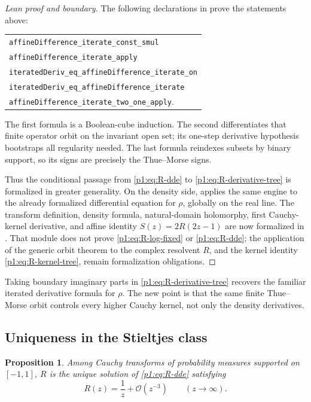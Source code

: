 \documentclass[11pt]{article}
\newtheorem{proposition}[theorem]{Proposition}
\theoremstyle{definition}
\theoremstyle{remark}
\newcommand{\bigO}{\mathcal O}
\begin{document}
\begin{proof}[Lean proof and boundary]
The following declarations in  prove the statements above:
\begin{center}
\small
\begin{tabular}{l}
\texttt{affineDifference\_iterate\_const\_smul}\\
\texttt{affineDifference\_iterate\_apply}\\
\texttt{iteratedDeriv\_eq\_affineDifference\_iterate\_on}\\
\texttt{iteratedDeriv\_eq\_affineDifference\_iterate}\\
\texttt{affineDifference\_iterate\_two\_one\_apply}.
\end{tabular}
\end{center}
The first formula is a
Boolean-cube induction.  The second differentiates that finite operator orbit on the
invariant open set; its one-step derivative hypothesis bootstraps all regularity needed.
The last formula reindexes subsets by binary support, so its signs are precisely the
Thue--Morse signs.

Thus the conditional passage from \eqref{p1:eq:R-dde} to
\eqref{p1:eq:R-derivative-tree} is formalized in greater generality.  On the density side,
 applies the same engine to the
already formalized differential equation for \(\rho\), globally on the real line.  The
transform definition, density formula, natural-domain holomorphy, first Cauchy-kernel
derivative, and affine identity \(S(z)=2R(2z-1)\) are now formalized in
.  That module does not prove
\eqref{p1:eq:R-log-fixed} or \eqref{p1:eq:R-dde}; the application of the generic orbit
theorem to the complex resolvent \(R\), and the kernel identity
\eqref{p1:eq:R-kernel-tree}, remain formalization obligations.
\end{proof}

Taking boundary imaginary parts in \eqref{p1:eq:R-derivative-tree} recovers the familiar
iterated derivative formula for \(\rho\).  The new point is that the same finite
Thue--Morse orbit controls every higher Cauchy kernel, not only the density derivatives.

\subsection{Uniqueness in the Stieltjes class}

\begin{proposition}\label{p1:prop:R-uniqueness}
Among Cauchy transforms of probability measures supported on \([-1,1]\), \(R\) is the
unique solution of \eqref{p1:eq:R-dde} satisfying
\begin{equation}
 R(z)=\frac1z+\bigO(z^{-3})\qquad(z\to\infty).               \label{p1:eq:R-normalization}
\end{equation}
\end{proposition}
\end{document}
